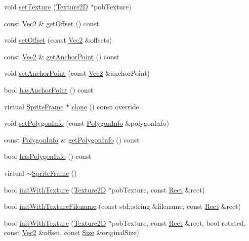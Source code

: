 \begin{DoxyCompactItemize}
void \hyperlink{classSpriteFrame_ae4908b4831f92cad38ff57af56c396e0}{set\+Texture} (\hyperlink{classTexture2D}{Texture2D} $\ast$pob\+Texture)
\item 
const \hyperlink{classVec2}{Vec2} \& \hyperlink{classSpriteFrame_a12d2d4aaa5c628e3df3e5aaa4750c6c0}{get\+Offset} () const
\item 
void \hyperlink{classSpriteFrame_a124c5d3b77a94966cf6c5ae428f9733c}{set\+Offset} (const \hyperlink{classVec2}{Vec2} \&offsets)
\item 
const \hyperlink{classVec2}{Vec2} \& \hyperlink{classSpriteFrame_ab8f72e26031bd3df4484a47bb0034f82}{get\+Anchor\+Point} () const
\item 
void \hyperlink{classSpriteFrame_a04d7b2e3d26984c6d47f82937cb226d1}{set\+Anchor\+Point} (const \hyperlink{classVec2}{Vec2} \&anchor\+Point)
\item 
bool \hyperlink{classSpriteFrame_acd8ff32e01d3692e36fb98b772c583e6}{has\+Anchor\+Point} () const
\item 
virtual \hyperlink{classSpriteFrame}{Sprite\+Frame} $\ast$ \hyperlink{classSpriteFrame_ae0b8735c582aa16c0a8996f691745faa}{clone} () const override
\item 
void \hyperlink{classSpriteFrame_ab4bf60eb887f7080959952e8e33f23c2}{set\+Polygon\+Info} (const \hyperlink{classPolygonInfo}{Polygon\+Info} \&polygon\+Info)
\item 
const \hyperlink{classPolygonInfo}{Polygon\+Info} \& \hyperlink{classSpriteFrame_a5fe06786a2638e9d38adde54fb34d4a4}{get\+Polygon\+Info} () const
\item 
bool \hyperlink{classSpriteFrame_aab1aa0e4f123b7b5be53bcc26edf1d26}{has\+Polygon\+Info} () const
\item 
virtual \hyperlink{classSpriteFrame_a1d8c776029a8731967ab5a7e206f8954}{$\sim$\+Sprite\+Frame} ()
\item 
bool \hyperlink{classSpriteFrame_ab6f82a9d511a1aeb016621dabda96669}{init\+With\+Texture} (\hyperlink{classTexture2D}{Texture2D} $\ast$pob\+Texture, const \hyperlink{classRect}{Rect} \&rect)
\item 
bool \hyperlink{classSpriteFrame_a148345ef7f3bb972f829c8345d8eafe6}{init\+With\+Texture\+Filename} (const std\+::string \&filename, const \hyperlink{classRect}{Rect} \&rect)
\item 
bool \hyperlink{classSpriteFrame_a34c705b9057c0fac4d6697a235c67df8}{init\+With\+Texture} (\hyperlink{classTexture2D}{Texture2D} $\ast$pob\+Texture, const \hyperlink{classRect}{Rect} \&rect, bool rotated, const \hyperlink{classVec2}{Vec2} \&offset, const \hyperlink{classSize}{Size} \&original\+Size)

\end{DoxyCompactItemize}
